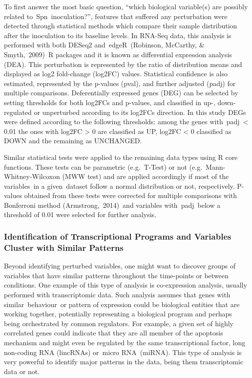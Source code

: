 \documentclass[
]{book}
\begin{document}
To first answer the most basic question, ``which biological variable(s) are possibly related to~Spn~inoculation?'', features that suffered any perturbation were detected through statistical methods which compare their sample distribution after the inoculation to its baseline levels. In RNA-Seq data, this analysis is performed with both DESeq2 and~edgeR~(Robinson, McCarthy, \& Smyth,~2009)⁠~R packages and it is known as differential expression analysis (DEA). This perturbation is represented by the ratio of distribution means and displayed as log2 fold-change (log2FC) values. Statistical confidence is also estimated, represented by the p-values (pval), and further adjusted (padj) for multiple comparisons. Deferentially expressed genes (DEG) can be selected by setting thresholds for both log2FCs and p-values, and classified in up-, down-regulated or unperturbed according to its log2FCs direction. In this study DEGs were defined according to the following thresholds: among the genes with~padj~\textless{} 0.01 the ones with log2FC \textgreater{} 0 are classified as UP, log2FC \textless{} 0 classified as DOWN and the remaining as UNCHANGED.

Similar statistical tests were applied to the remaining data types using R core functions. These tests can be parametric (e.g.~T-Test) or not (e.g.~Mann-Whitney-Wilcoxon (MWW test) and are applied accordingly if most of the variables~in a given~dataset follow a normal distribution or not, respectively. P-values obtained from these tests were corrected for multiple comparisons with Bonferroni method (Armstrong,~2014)⁠~and variables with~padj~below a threshold of 0.01 were selected for further analysis.

\hypertarget{identification-of-transcriptional-programs-and-variables-cluster-with-similar-patterns}{%
\subsubsection{Identification of Transcriptional Programs and Variables Cluster with Similar Patterns}\label{identification-of-transcriptional-programs-and-variables-cluster-with-similar-patterns}}

Beyond identifying perturbed variables, one might want to discover groups of variables that have similar patterns throughout the time-points or between conditions. One example of this type of analysis is co-expression analysis, usually performed with transcriptomic data. Such analysis assumes that genes with similar~behaviour~or pattern of expression could be biological entities that are working together, potentially representing a biological program and perhaps being orchestrated by common regulators. For example, a given set of highly correlated genes could indicate that they are all member of the apoptosis mechanism and might even be regulated by the same transcriptional factor, long non-coding RNA (lincRNAs) or~micro RNA~(miRNA). This type of analysis is very powerful to identify major patterns in the data, being them transcriptomic data or not.
\end{document}
